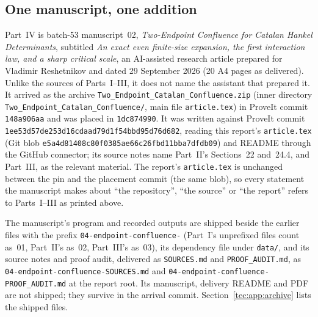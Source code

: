 \documentclass[11pt,a4paper]{article}
\numberwithin{equation}{section}
\theoremstyle{definition}
\theoremstyle{remark}
\begin{document}
\subsection{One manuscript, one addition}\label{tec:sec:source}
Part~IV is batch-53 manuscript~02, \emph{Two-Endpoint Confluence for
Catalan Hankel Determinants}, subtitled \emph{An exact even finite-size
expansion, the first interaction law, and a sharp critical scale}, an
AI-assisted research article prepared for Vladimir Reshetnikov and dated
29 September 2026 (20 A4 pages as delivered).  Unlike the sources of
Parts~I--III, it does not name the assistant that prepared it.  It
arrived as the archive \nolinkurl{Two_Endpoint_Catalan_Confluence.zip}
(inner directory \nolinkurl{Two_Endpoint_Catalan_Confluence/}, main file
\nolinkurl{article.tex}) in ProveIt commit \texttt{148a906aa} and was
placed in \texttt{1dc874990}.  It was written against ProveIt commit
\texttt{1ee53d57de253d16cdaad79d1f54bbd95d76d682}, reading this report's
\nolinkurl{article.tex} (Git blob
\texttt{e5a4d81408c80f0385ae66c26fbd11bba7dfdb09}) and README through the
GitHub connector; its source notes name Part~II's Sections~22 and~24.4,
and Part~III, as the relevant material.  The report's
\nolinkurl{article.tex} is unchanged between the pin and the placement
commit (the same blob), so every statement the manuscript makes about
``the repository'', ``the source'' or ``the report'' refers to
Parts~I--III as printed above.

The manuscript's program and recorded outputs are shipped beside the
earlier files with the prefix \texttt{04-endpoint-confluence-} (Part~I's
unprefixed files count as~01, Part~II's as~02, Part~III's as~03), its
dependency file under \nolinkurl{data/}, and its source notes and proof
audit, delivered as \nolinkurl{SOURCES.md} and \nolinkurl{PROOF_AUDIT.md},
as \nolinkurl{04-endpoint-confluence-SOURCES.md} and
\nolinkurl{04-endpoint-confluence-PROOF_AUDIT.md} at the report root.  Its
manuscript, delivery README and PDF are not shipped; they survive in the
arrival commit.  Section~\ref{tec:app:archive} lists the shipped files.
\end{document}
